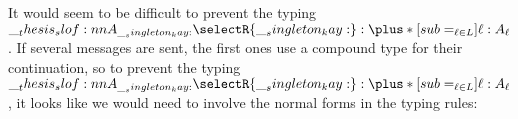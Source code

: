 It would seem to be difficult to prevent the typing $\slof{A_{\kay} |- \selectR{\kay} : \plus*[sub=_{\ell \in L}]{\ell:A_{\ell}}}$.
If several messages are sent, the first ones use a compound type for their continuation, so to prevent the typing $\slof{A_{\kay} |- \selectR{\kay} : \plus*[sub=_{\ell \in L}]{\ell:A_{\ell}}}$, it looks like we would need to involve the normal forms in the typing rules:

